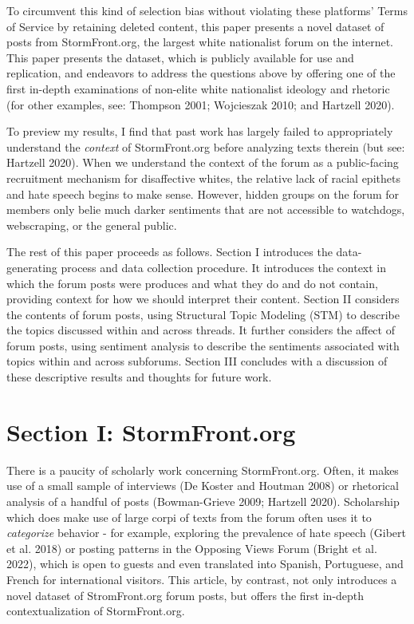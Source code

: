 \documentclass[12pt]{paper}
\begin{document}
To circumvent this kind of selection bias without violating these platforms’ Terms of Service by retaining deleted content, this paper presents a novel dataset of posts from StormFront.org, the largest white nationalist forum on the internet. This paper presents the dataset, which is publicly available for use and replication,  and endeavors to address the questions above by offering one of the first in-depth examinations of non-elite white nationalist ideology and rhetoric (for other examples, see: Thompson 2001; Wojcieszak 2010; and Hartzell 2020).  

To preview my results, I find that past work has largely failed to appropriately understand the \textit{context} of StormFront.org before analyzing texts therein (but see: Hartzell 2020). When we understand the context of the forum as a public-facing recruitment mechanism for disaffective whites, the relative lack of racial epithets and hate speech begins to make sense. However, hidden groups on the forum for members only belie much darker sentiments that are not accessible to watchdogs, webscraping, or the general public.

The rest of this paper proceeds as follows. Section I introduces the data-generating process and data collection procedure. It introduces the context in which the forum posts were produces and what they do and do not contain, providing context for how we should interpret their content. Section II considers the contents of forum posts, using Structural Topic Modeling (STM) to describe the topics discussed within and across threads. It further considers the affect of forum posts, using sentiment analysis to describe the sentiments associated with topics within and across subforums. Section III concludes with a discussion of these descriptive results and thoughts for future work.

\section{Section I: StormFront.org}
There is a paucity of scholarly work concerning StormFront.org. Often, it makes use of a small sample of interviews (De Koster and Houtman 2008) or rhetorical analysis of a handful of posts (Bowman-Grieve 2009; Hartzell 2020). Scholarship which does make use of large corpi of texts from the forum often uses it to \textit{categorize} behavior - for example, exploring the prevalence of hate speech (Gibert et al.
2018) or posting patterns in the Opposing Views Forum (Bright et al. 2022), which is open to guests and even translated into Spanish, Portuguese, and French for international visitors. This article, by contrast, not only introduces a novel dataset of StromFront.org forum posts, but offers the first in-depth contextualization of StormFront.org.
\end{document}
